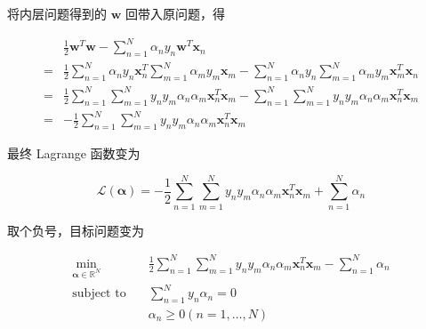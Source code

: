 \documentclass[a4paper]{article}
\begin{document}
将内层问题得到的 $\mathbf{w}$ 回带入原问题，得

\begin{equation}
\begin{aligned}
  &\frac{1}{2}\mathbf{w}^{T}\mathbf{w} - \sum_{n=1}^{N}\alpha_n y_n \mathbf{w}^{T}\mathbf{x}_n \\
= &\frac{1}{2} \sum_{n=1}^{N}\alpha_n y_n \mathbf{x}_n^{T} \sum_{m=1}^{N}\alpha_m y_m \mathbf{x}_m - \sum_{n=1}^{N}\alpha_n y_n \sum_{m=1}^{N}\alpha_m y_m \mathbf{x}_m^{T}\mathbf{x}_n \\
= &\frac{1}{2} \sum_{n=1}^{N} \sum_{m=1}^{N} y_n y_m \alpha_n \alpha_m \mathbf{x}_n^{T} \mathbf{x}_m - \sum_{n=1}^{N} \sum_{m=1}^{N} y_n y_m \alpha_n \alpha_m \mathbf{x}_n^{T} \mathbf{x}_m \\
= &-\frac{1}{2} \sum_{n=1}^{N} \sum_{m=1}^{N} y_n y_m \alpha_n \alpha_m \mathbf{x}_n^{T} \mathbf{x}_m
\end{aligned}
\end{equation}

最终 Lagrange 函数变为

$$\mathcal{L}(\mathbf{\alpha}) = -\frac{1}{2} \sum_{n=1}^{N} \sum_{m=1}^{N} y_n y_m \alpha_n \alpha_m \mathbf{x}_n^{T} \mathbf{x}_m + \sum_{n=1}^{N}\alpha_n$$

取个负号，目标问题变为

\begin{equation}
\begin{aligned}
\min_{\mathbf{\alpha} \in \mathbb{R}^{N}} \quad &\frac{1}{2} \sum_{n=1}^{N} \sum_{m=1}^{N} y_n y_m \alpha_n \alpha_m \mathbf{x}_n^{T} \mathbf{x}_m - \sum_{n=1}^{N}\alpha_n \\
\text{subject to} \quad &\sum_{n=1}^{N}y_n\alpha_n = 0\\
                        &\alpha_n \ge 0 (n = 1, \dots, N)\\
\end{aligned}
\end{equation}
\end{document}
